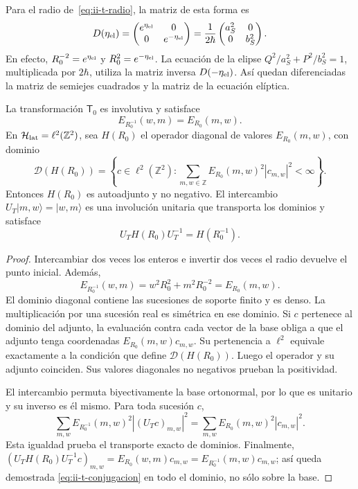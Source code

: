 Para el radio de~\eqref{eq:ii-t-radio}, la matriz de esta forma es
\begin{equation}
 D(\eta_{\rm el})=
 \begin{pmatrix}e^{\eta_{\rm el}}&0\\0&e^{-\eta_{\rm el}}\end{pmatrix}
 =\frac{1}{2\hbar}
 \begin{pmatrix}a_S^2&0\\0&b_S^2\end{pmatrix}.
 \label{eq:ii-t-matriz}
\end{equation}
En efecto, \(R_0^{-2}=e^{\eta_{\rm el}}\) y
\(R_0^2=e^{-\eta_{\rm el}}\). La ecuación de la elipse
\(Q^2/a_S^2+P^2/b_S^2=1\), multiplicada por \(2\hbar\), utiliza
la matriz inversa \(D(-\eta_{\rm el})\). Así quedan diferenciadas
la matriz de semiejes cuadrados y la matriz de la ecuación elíptica.

\begin{theorem}
\label{thm:ii-t-unitaria}
La transformación \(\mathsf T_0\) es involutiva y satisface
\begin{equation}
 E_{R_0^{-1}}(w,m)=E_{R_0}(m,w).
 \label{eq:ii-t-invariancia}
\end{equation}
En \(\mathcal H_{\rm lat}=\ell^2(\mathbb Z^2)\), sea \(H(R_0)\)
el operador diagonal de valores \(E_{R_0}(m,w)\), con dominio
\[
 \mathcal D(H(R_0))=
 \left\{c\in\ell^2(\mathbb Z^2):
 \sum_{m,w\in\mathbb Z}E_{R_0}(m,w)^2|c_{m,w}|^2<\infty\right\}.
\]
Entonces \(H(R_0)\) es autoadjunto y no negativo. El intercambio
\(U_T|m,w\rangle=|w,m\rangle\) es una involución unitaria que
transporta los dominios y satisface
\begin{equation}
 U_T H(R_0)U_T^{-1}=H(R_0^{-1}).
 \label{eq:ii-t-conjugacion}
\end{equation}
\end{theorem}

\begin{proof}
Intercambiar dos veces los enteros e invertir dos veces el radio devuelve
el punto inicial. Además,
\[
 E_{R_0^{-1}}(w,m)=w^2R_0^2+m^2R_0^{-2}=E_{R_0}(m,w).
\]
El dominio diagonal contiene las sucesiones de soporte finito y es denso.
La multiplicación por una sucesión real es simétrica en ese dominio.
Si \(c\) pertenece al dominio del adjunto, la evaluación contra cada
vector de la base obliga a que el adjunto tenga coordenadas
\(E_{R_0}(m,w)c_{m,w}\). Su pertenencia a \(\ell^2\) equivale
exactamente a la condición que define \(\mathcal D(H(R_0))\).
Luego el operador y su adjunto coinciden. Sus valores diagonales no
negativos prueban la positividad.

El intercambio permuta biyectivamente la base ortonormal, por lo que es
unitario y su inverso es él mismo. Para toda sucesión \(c\),
\[
 \sum_{m,w}E_{R_0^{-1}}(m,w)^2|(U_Tc)_{m,w}|^2
 =\sum_{m,w}E_{R_0}(m,w)^2|c_{m,w}|^2.
\]
Esta igualdad prueba el transporte exacto de dominios. Finalmente,
\((U_TH(R_0)U_T^{-1}c)_{m,w}=E_{R_0}(w,m)c_{m,w}
=E_{R_0^{-1}}(m,w)c_{m,w}\); así queda demostrada
\eqref{eq:ii-t-conjugacion} en todo el dominio, no sólo sobre la base.
\end{proof}

